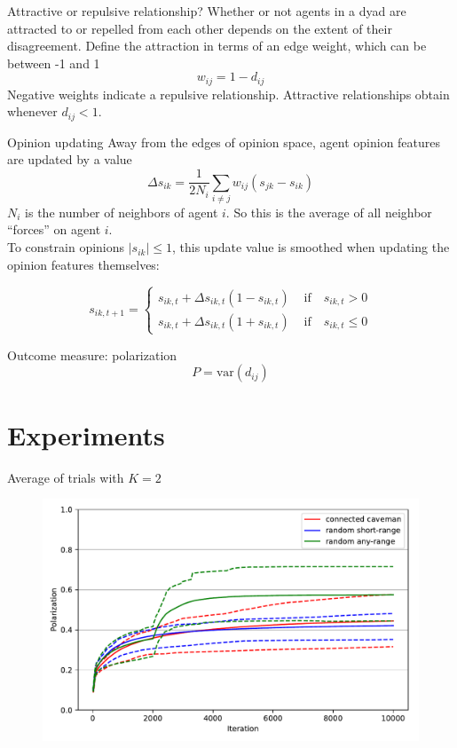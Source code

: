 \documentclass[11pt]{beamer}
\begin{document}
\begin{frame}{Attractive or repulsive relationship?}
  Whether or not agents in a dyad are attracted to or repelled from each other
  depends on the extent of their disagreement. Define the attraction in
  terms of an edge weight, which can be between -1 and 1
  \[
    w_{ij} = 1 - d_{ij}
  \]
  Negative weights indicate a repulsive relationship. Attractive relationships
  obtain whenever $d_{ij} < 1$.
\end{frame}

\begin{frame}{Opinion updating}
  Away from the edges of opinion space, agent opinion features
  are updated by a value
  \[
    \Delta s_{ik} = \frac{1}{2 N_i}\sum_{i \neq j} w_{ij} \left( s_{jk} - s_{ik} \right)
  \]
  $N_i$ is the number of neighbors of agent $i$. So this is the average of 
  all neighbor ``forces'' on agent $i$.
  \\[1em]
  To constrain opinions $|s_{ik}| \leq 1$, this update value is smoothed when
  updating the opinion features themselves:

  \[
    s_{ik,t+1} = \begin{cases}
      s_{ik,t} + \Delta s_{ik,t}(1 - s_{ik,t}) & \text{ if} \quad s_{ik,t} > 0 \\
      s_{ik,t} + \Delta s_{ik,t}(1 + s_{ik,t}) & \text{ if} \quad s_{ik,t} \leq 0
    \end{cases}
  \]
\end{frame}

\begin{frame}{Outcome measure: polarization}
  \[
    P = \text{var}(d_{ij})
  \]
\end{frame}

\section{Experiments}

\begin{frame}{Average of trials with $K=2$}
\begin{figure}
  \centering
  \includegraphics[width=\textwidth]{Figures/figure10b.pdf}
\end{figure} 
\end{frame}
\end{document}
